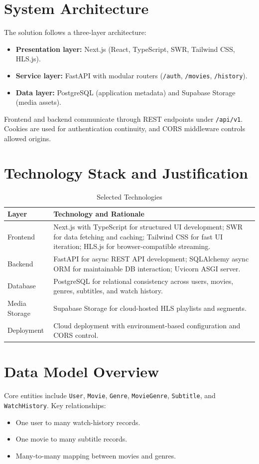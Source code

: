 \documentclass[conference]{IEEEtran}
\begin{document}
\section{System Architecture}
The solution follows a three-layer architecture:
\begin{itemize}
\item \textbf{Presentation layer:} Next.js (React, TypeScript, SWR, Tailwind CSS, HLS.js).
\item \textbf{Service layer:} FastAPI with modular routers (\texttt{/auth}, \texttt{/movies}, \texttt{/history}).
\item \textbf{Data layer:} PostgreSQL (application metadata) and Supabase Storage (media assets).
\end{itemize}

Frontend and backend communicate through REST endpoints under \texttt{/api/v1}. Cookies are used for authentication continuity, and CORS middleware controls allowed origins.

\section{Technology Stack and Justification}
\begin{table}[h]
\caption{Selected Technologies}
\label{tab:stack}
\centering
\begin{tabular}{p{2.1cm} p{4.8cm}}
\toprule
\textbf{Layer} & \textbf{Technology and Rationale} \\
\midrule
Frontend & Next.js with TypeScript for structured UI development; SWR for data fetching and caching; Tailwind CSS for fast UI iteration; HLS.js for browser-compatible streaming. \\
Backend & FastAPI for async REST API development; SQLAlchemy async ORM for maintainable DB interaction; Uvicorn ASGI server. \\
Database & PostgreSQL for relational consistency across users, movies, genres, subtitles, and watch history. \\
Media Storage & Supabase Storage for cloud-hosted HLS playlists and segments. \\
Deployment & Cloud deployment with environment-based configuration and CORS control. \\
\bottomrule
\end{tabular}
\end{table}

\section{Data Model Overview}
Core entities include \texttt{User}, \texttt{Movie}, \texttt{Genre}, \texttt{MovieGenre}, \texttt{Subtitle}, and \texttt{WatchHistory}. Key relationships:
\begin{itemize}
\item One user to many watch-history records.
\item One movie to many subtitle records.
\item Many-to-many mapping between movies and genres.
\end{itemize}
\end{document}
